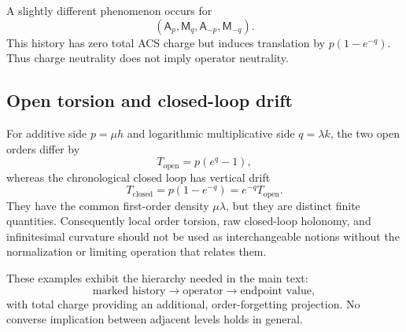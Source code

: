 A slightly different phenomenon occurs for
\[
    (\mathsf A_p,\mathsf M_q,\mathsf A_{-p},\mathsf M_{-q}).
\]
This history has zero total ACS charge but induces translation by
\(p(1-e^{-q})\).  Thus charge neutrality does not imply operator neutrality.

\subsection{Open torsion and closed-loop drift}

For additive side \(p=\mu h\) and logarithmic multiplicative side
\(q=\lambda k\), the two open orders differ by
\[
    T_{\mathrm{open}}=p(e^q-1),
\]
whereas the chronological closed loop has vertical drift
\[
    T_{\mathrm{closed}}=p(1-e^{-q})=e^{-q}T_{\mathrm{open}}.
\]
They have the common first-order density \(\mu\lambda\), but they are distinct
finite quantities.  Consequently local order torsion, raw closed-loop
holonomy, and infinitesimal curvature should not be used as interchangeable
notions without the normalization or limiting operation that relates them.

These examples exhibit the hierarchy needed in the main text:
\[
    \text{marked history}
      \longrightarrow \text{operator}
      \longrightarrow \text{endpoint value},
\]
with total charge providing an additional, order-forgetting projection.  No
converse implication between adjacent levels holds in general.
